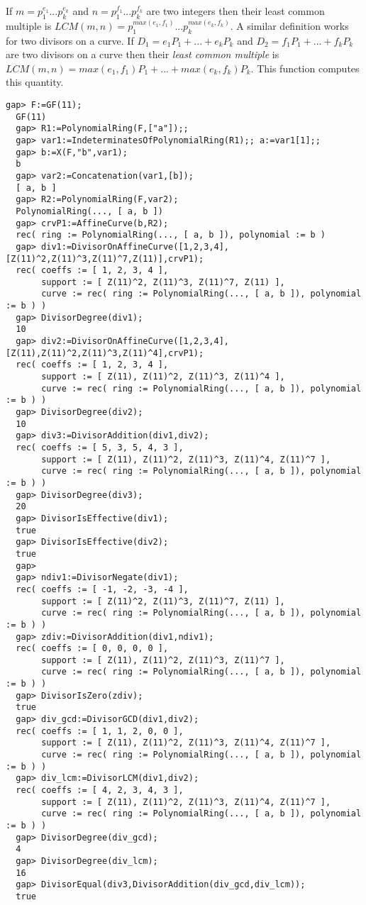 \documentclass[a4paper,11pt]{report}
\begin{document}
{{{ If $m=p_1^{e_1}...p_k^{e_k}$ and $n=p_1^{f_1}...p_k^{f_k}$ are two integers then their least common multiple is $LCM(m,n)=p_1^{max(e_1,f_1)}...p_k^{max(e_k,f_k)}$. A similar definition works for two divisors on a curve. If $D_1=e_1P_1+...+e_kP_k$ and $D_2=f_1P_1+...+f_kP_k$ are two divisors on a curve then their \emph{least common multiple}  is $LCM(m,n)=max(e_1,f_1)P_1+...+max(e_k,f_k)P_k$. This function computes this quantity. 
\begin{Verbatim}[fontsize=\small,frame=single,label=Example]
  gap> F:=GF(11);
  GF(11)
  gap> R1:=PolynomialRing(F,["a"]);;
  gap> var1:=IndeterminatesOfPolynomialRing(R1);; a:=var1[1];;
  gap> b:=X(F,"b",var1);
  b
  gap> var2:=Concatenation(var1,[b]);
  [ a, b ]
  gap> R2:=PolynomialRing(F,var2);
  PolynomialRing(..., [ a, b ])
  gap> crvP1:=AffineCurve(b,R2);
  rec( ring := PolynomialRing(..., [ a, b ]), polynomial := b )
  gap> div1:=DivisorOnAffineCurve([1,2,3,4],[Z(11)^2,Z(11)^3,Z(11)^7,Z(11)],crvP1);
  rec( coeffs := [ 1, 2, 3, 4 ], 
       support := [ Z(11)^2, Z(11)^3, Z(11)^7, Z(11) ], 
       curve := rec( ring := PolynomialRing(..., [ a, b ]), polynomial := b ) )
  gap> DivisorDegree(div1);
  10
  gap> div2:=DivisorOnAffineCurve([1,2,3,4],[Z(11),Z(11)^2,Z(11)^3,Z(11)^4],crvP1);
  rec( coeffs := [ 1, 2, 3, 4 ], 
       support := [ Z(11), Z(11)^2, Z(11)^3, Z(11)^4 ], 
       curve := rec( ring := PolynomialRing(..., [ a, b ]), polynomial := b ) )
  gap> DivisorDegree(div2);
  10
  gap> div3:=DivisorAddition(div1,div2);
  rec( coeffs := [ 5, 3, 5, 4, 3 ], 
       support := [ Z(11), Z(11)^2, Z(11)^3, Z(11)^4, Z(11)^7 ], 
       curve := rec( ring := PolynomialRing(..., [ a, b ]), polynomial := b ) )
  gap> DivisorDegree(div3);
  20
  gap> DivisorIsEffective(div1);
  true
  gap> DivisorIsEffective(div2);
  true
  gap>
  gap> ndiv1:=DivisorNegate(div1);
  rec( coeffs := [ -1, -2, -3, -4 ], 
       support := [ Z(11)^2, Z(11)^3, Z(11)^7, Z(11) ], 
       curve := rec( ring := PolynomialRing(..., [ a, b ]), polynomial := b ) )
  gap> zdiv:=DivisorAddition(div1,ndiv1);
  rec( coeffs := [ 0, 0, 0, 0 ], 
       support := [ Z(11), Z(11)^2, Z(11)^3, Z(11)^7 ], 
       curve := rec( ring := PolynomialRing(..., [ a, b ]), polynomial := b ) )
  gap> DivisorIsZero(zdiv);
  true
  gap> div_gcd:=DivisorGCD(div1,div2);
  rec( coeffs := [ 1, 1, 2, 0, 0 ], 
       support := [ Z(11), Z(11)^2, Z(11)^3, Z(11)^4, Z(11)^7 ], 
       curve := rec( ring := PolynomialRing(..., [ a, b ]), polynomial := b ) )
  gap> div_lcm:=DivisorLCM(div1,div2);
  rec( coeffs := [ 4, 2, 3, 4, 3 ], 
       support := [ Z(11), Z(11)^2, Z(11)^3, Z(11)^4, Z(11)^7 ], 
       curve := rec( ring := PolynomialRing(..., [ a, b ]), polynomial := b ) )
  gap> DivisorDegree(div_gcd);
  4
  gap> DivisorDegree(div_lcm);
  16
  gap> DivisorEqual(div3,DivisorAddition(div_gcd,div_lcm));
  true
  

\end{Verbatim}}}}
\end{document}
